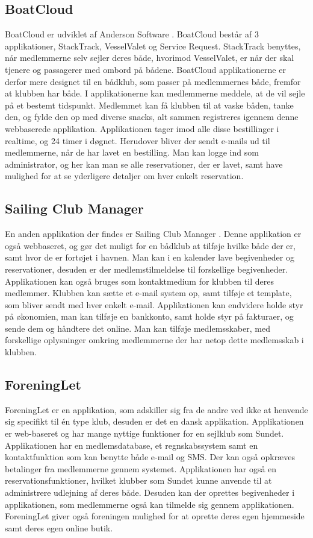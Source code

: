 \subsection*{BoatCloud}

BoatCloud er udviklet af Anderson Software \citep{BoatCloud}.
BoatCloud består af 3 applikationer, StackTrack, VesselValet og Service Request. 
StackTrack benyttes, når medlemmerne selv sejler deres både, hvorimod VesselValet, er når der skal tjenere og passagerer med ombord på bådene. 
BoatCloud applikationerne er derfor mere designet til en bådklub, som passer på medlemmernes både, fremfor at klubben har både. 
I applikationerne kan medlemmerne meddele, at de vil sejle på et bestemt tidspunkt. 
Medlemmet kan få klubben til at vaske båden, tanke den, og fylde den op med diverse snacks, alt sammen registreres igennem denne webbaserede applikation. 
Applikationen tager imod alle disse bestillinger i realtime, og 24 timer i døgnet. 
Herudover bliver der sendt e-mails ud til medlemmerne, når de har lavet en bestilling. 
Man kan logge ind som administrator, og her kan man se alle reservationer, der er lavet, samt have mulighed for at se yderligere detaljer om hver enkelt reservation.


\subsection*{Sailing Club Manager}

En anden applikation der findes er Sailing Club Manager \citep{SailClub}. 
Denne applikation er også webbaseret, og gør det muligt for en bådklub at tilføje hvilke både der er, samt hvor de er fortøjet i havnen. 
Man kan i en kalender lave begivenheder og reservationer, desuden er der medlemstilmeldelse til forskellige begivenheder. Applikationen kan også bruges som kontaktmedium for klubben til deres medlemmer. 
Klubben kan sætte et e-mail system op, samt tilføje et template, som bliver sendt med hver enkelt e-mail.
Applikationen kan endvidere holde styr på økonomien, man kan tilføje en bankkonto, samt  holde styr på fakturaer, og sende dem og håndtere det online. 
Man kan tilføje medlemsskaber, med forskellige oplysninger omkring medlemmerne der har netop dette medlemsskab i klubben.

\subsection*{ForeningLet}

ForeningLet er en applikation, som adskiller sig fra de andre ved ikke at henvende sig specifikt til én type klub, desuden er det en dansk applikation. 
Applikationen er web-baseret og har mange nyttige funktioner for en sejlklub som Sundet. 
Applikationen har en medlemsdatabase, et regnskabssystem samt en kontaktfunktion som kan benytte både e-mail og SMS. 
Der kan også opkræves betalinger fra medlemmerne gennem systemet. 
Applikationen har også en reservationsfunktioner, hvilket klubber som Sundet kunne anvende til at administrere udlejning af deres både. 
Desuden kan der oprettes begivenheder i applikationen, som medlemmerne også kan tilmelde sig gennem applikationen. ForeningLet giver også foreningen mulighed for at oprette deres egen hjemmeside samt deres egen online butik. 

